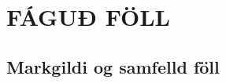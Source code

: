 \newenvironment{se}{\begin{setning+}\sl}{\hfill$\square$\end{setning+}\rm}
\newenvironment{sex}{\begin{setning+}\sl}{\hfill$\blacksquare$\end{setning+}\rm}
\newenvironment{sk}{\begin{skilgreining+}\rm}{\hfill$\square$\end{skilgreining+}\rm}
\newenvironment{sesk}{\begin{setningogskilgreining+}\rm}{\hfill$\square$\end{setningogskilgreining+}\rm}
\newenvironment{hs}{\begin{hjalparsetning+}\sl}{\hfill$\square$\end{hjalparsetning+}\rm}
\newenvironment{fs}{\begin{fylgisetning+}\sl}{\hfill$\square$\end{fylgisetning+}\rm}
\newenvironment{sy}{\begin{synidaemi+}\rm}{\hfill$\square$\end{synidaemi+}\rm}
\newenvironment{fo}{\begin{forrit+}\rm}{\hfill\end{forrit+}\rm}
\newenvironment{so}{\medbreak\noindent{\it Sönnun:}\rm}{\hfill$\blacksquare$\rm}
\newenvironment{sotx}[1]{\medbreak\noindent{\it #1:}\rm}{\hfill$\blacksquare$\rm}
\newcommand{\aefing}{\section{Æfingardæmi} \setcounter{daemateljari}{1}}
\newcommand{\daemi}{
{\medskip\noindent{\bf \thedaemateljari.}}
\addtocounter{daemateljari}{1}
}

\def\svar#1{\smallskip\noindent{\bf #1.} \ }
\def\lausn#1{\smallskip\noindent{\bf #1.} \ }
\def\ugrein#1{\medbreak\noindent{\bf #1.} }
\newcommand{\samantekt}{\noindent{\bf Samantekt.} }

%
\chapter
{FÁGUÐ FÖLL}
 



\section{Markgildi og samfelld föll}

